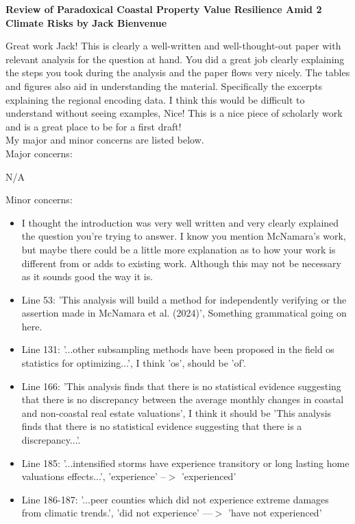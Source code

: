 \documentclass[11pt]{article}
\begin{document}
\begin{center} \Large \bf
  Review of Paradoxical Coastal Property Value Resilience Amid
2 Climate Risks by Jack Bienvenue
\end{center}


Great work Jack! This is clearly a well-written and well-thought-out paper with relevant analysis for the question at hand. You did a great job clearly explaining the steps you took during the analysis and the paper flows very nicely. The tables and figures also aid in understanding the material. Specifically the excerpts explaining the regional encoding data. I think this would be difficult to understand without seeing examples, Nice! This is a nice piece of scholarly work and is a great place to be for a first draft!\\

My major and minor concerns are listed below.\\

\noindent Major concerns:

N/A


\noindent Minor concerns:

\begin{itemize}

\item I thought the introduction was very well written and very clearly explained the question you're trying to answer. I know you mention McNamara's work, but maybe there could be a little more explanation as to how your work is different from or adds to existing work. Although this may not be necessary as it sounds good the way it is.

\item Line 53: 'This analysis will build a method for independently verifying or the assertion made in McNamara et al. (2024)', Something grammatical going on here.

\item Line 131: '...other subsampling methods have been proposed in the field os statistics for optimizing...', I think 'os', should be 'of'.

\item Line 166: 'This analysis finds that there is no statistical evidence suggesting that there is no discrepancy between the average monthly changes in coastal and non-coastal real estate valuations', I think it should be 'This analysis finds that there is no statistical evidence suggesting that there is a discrepancy...'. 

\item Line 185: '...intensified storms have experience transitory or long lasting home valuations effects...', 'experience' --$>$ 'experienced'

\item Line 186-187: '...peer counties which did not experience extreme damages from climatic trends.', 'did not experience' ---$>$ 'have not experienced'


\end{itemize}




%
% 
\end{document}
